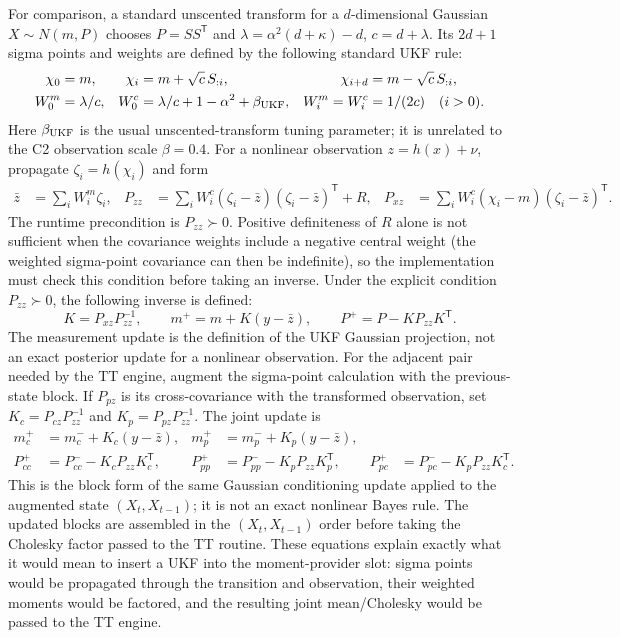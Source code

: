 \documentclass[11pt]{article}
\begin{document}
For comparison, a standard unscented transform for a $d$-dimensional Gaussian
$X\sim N(m,P)$ chooses $P=SS^\mathsf T$ and
$\lambda=\alpha^2(d+\kappa)-d$, $c=d+\lambda$.  Its $2d+1$ sigma points and
weights are defined by the following standard UKF rule:
\begin{align}
  \chi_0&=m,&
  \chi_i&=m+\sqrt c\,S_{:i},&
  \chi_{i+d}&=m-\sqrt c\,S_{:i},
  \label{eq:actual-ukf-points}\\
  W_0^m&=\lambda/c,&
  W_0^c&=\lambda/c+1-\alpha^2+\beta_{\rm UKF},&
  W_i^m=W_i^c&=1/(2c)\quad(i>0).
  \label{eq:actual-ukf-weights}
\end{align}
Here $\beta_{\rm UKF}$ is the usual unscented-transform tuning parameter; it
is unrelated to the C2 observation scale $\beta=0.4$.
For a nonlinear observation $z=h(x)+\nu$, propagate
$\zeta_i=h(\chi_i)$ and form
\begin{align}
  \bar z&=\sum_iW_i^m\zeta_i,&
  P_{zz}&=\sum_iW_i^c(\zeta_i-\bar z)(\zeta_i-\bar z)^\mathsf T+R,&
  P_{xz}&=\sum_iW_i^c(\chi_i-m)(\zeta_i-\bar z)^\mathsf T.
  \label{eq:actual-ukf-moments}
\end{align}
The runtime precondition is $P_{zz}\succ0$.  Positive definiteness of $R$
alone is not sufficient when the covariance weights include a negative
central weight (the weighted sigma-point covariance can then be indefinite),
so the implementation must check this condition before taking an inverse.
Under the explicit condition $P_{zz}\succ0$, the following inverse is
defined:
\begin{equation}
  K=P_{xz}P_{zz}^{-1},
  \qquad m^+=m+K(y-\bar z),
  \qquad P^+=P-KP_{zz}K^\mathsf T.
  \label{eq:actual-ukf-update}
\end{equation}
The measurement update is the definition of the UKF Gaussian projection,
not an exact posterior update for a nonlinear observation.
For the adjacent pair needed by the TT engine, augment the sigma-point
calculation with the previous-state block.  If $P_{pz}$ is its
cross-covariance with the transformed observation, set
$K_c=P_{cz}P_{zz}^{-1}$ and $K_p=P_{pz}P_{zz}^{-1}$.  The joint update is
\begin{align}
  m_c^+&=m_c^-+K_c(y-\bar z),&
  m_p^+&=m_p^-+K_p(y-\bar z),\\
  P_{cc}^+&=P_{cc}^--K_cP_{zz}K_c^\mathsf T,&
  P_{pp}^+&=P_{pp}^--K_pP_{zz}K_p^\mathsf T,&
  P_{pc}^+&=P_{pc}^--K_pP_{zz}K_c^\mathsf T.
  \label{eq:actual-ukf-joint-update}
\end{align}
This is the block form of the same Gaussian conditioning update applied to
the augmented state $(X_t,X_{t-1})$; it is not an exact nonlinear Bayes rule.
The updated blocks are assembled in the $(X_t,X_{t-1})$ order before taking
the Cholesky factor passed to the TT routine.
These equations explain exactly what it would mean to insert a UKF into the
moment-provider slot: sigma points would be propagated through the transition
and observation, their weighted moments would be factored, and the resulting
joint mean/Cholesky would be passed to the TT engine.
\end{document}

